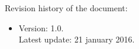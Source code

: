 Revision history of the document:
\begin{itemize}
    \item Version: 1.0. \\
    Latest update: 21 january 2016.
\end{itemize}